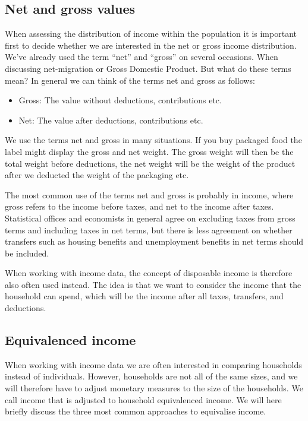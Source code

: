 \documentclass[
]{book}
\providecommand{\tightlist}{%
  \setlength{\itemsep}{0pt}\setlength{\parskip}{0pt}}
\begin{document}
\hypertarget{net-and-gross-values}{%
\subsection*{Net and gross values}\label{net-and-gross-values}}

When assessing the distribution of income within the population it is important first to decide whether we are interested in the net or gross income distribution. We've already used the term ``net'' and ``gross'' on several occasions. When discussing net-migration or Gross Domestic Product. But what do these terms mean? In general we can think of the terms net and gross as follows:

\begin{itemize}
\tightlist
\item
  Gross: The value without deductions, contributions etc.
\item
  Net: The value after deductions, contributions etc.
\end{itemize}

We use the terms net and gross in many situations. If you buy packaged food the label might display the gross and net weight. The gross weight will then be the total weight before deductions, the net weight will be the weight of the product after we deducted the weight of the packaging etc.

The most common use of the terms net and gross is probably in income, where gross refers to the income before taxes, and net to the income after taxes. Statistical offices and economists in general agree on excluding taxes from gross terms and including taxes in net terms, but there is less agreement on whether transfers such as housing benefits and unemployment benefits in net terms should be included.

When working with income data, the concept of disposable income is therefore also often used instead. The idea is that we want to consider the income that the household can spend, which will be the income after all taxes, transfers, and deductions.

\hypertarget{equivalenced-income}{%
\subsection*{Equivalenced income}\label{equivalenced-income}}

When working with income data we are often interested in comparing households instead of individuals. However, households are not all of the same sizes, and we will therefore have to adjust monetary measures to the size of the households. We call income that is adjusted to household equivalenced income. We will here briefly discuss the three most common approaches to equivalise income.
\end{document}
